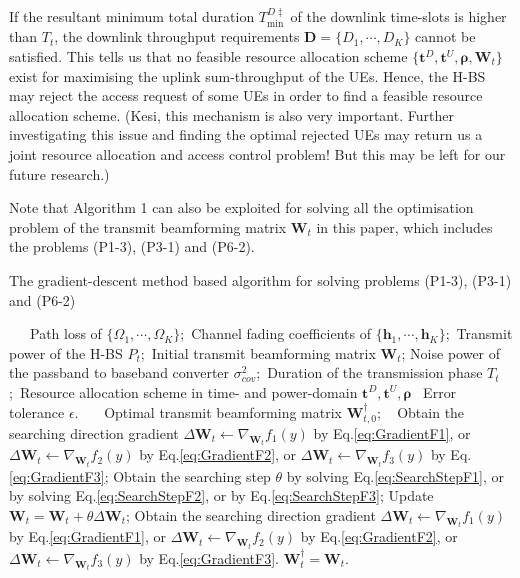 \documentclass[12pt,draft,onecolumn,journal]{IEEEtran}
\begin{document}
If the resultant minimum total duration $T_{\min}^{D\ddagger}$ of the downlink time-slots is higher than $T_t$, the downlink throughput requirements $\mathbf{D}=\{D_1,\cdots,D_K\}$ cannot be satisfied. This tells us that no feasible resource allocation scheme $\{\mathbf{t}^D, \mathbf{t}^U, \boldsymbol{\rho}, \mathbf{W}_t\}$ exist for maximising the uplink sum-throughput of the UEs. Hence, the H-BS may reject the access request of some UEs in order to find a feasible resource allocation scheme. {\color{red} (Kesi, this mechanism is also very important. Further investigating this issue and finding the optimal rejected UEs may return us a joint resource allocation and access control problem! But this may be left for our future research.)}

Note that Algorithm 1 can also be exploited for solving all the optimisation problem of the transmit beamforming matrix $\mathbf{W}_t$ in this paper, which includes the problems (P1-3), (P3-1) and (P6-2). 

\begin{algorithm}[!t]
	\caption{The gradient-descent method based algorithm for solving problems (P1-3), (P3-1) and (P6-2)}
	\footnotesize
	\begin{algorithmic}[1]
		\REQUIRE ~~\
		Path loss of $\{\Omega_1,\cdots,\Omega_K\}$;\
		Channel fading coefficients of $\{\mathbf{h}_1,\cdots,\mathbf{h}_K\}$;\
		Transmit power of the H-BS $P_{t}$;\
		Initial transmit beamforming matrix $\mathbf{W}_t$;
		Noise power of the passband to baseband converter $\sigma^2_{cov}$;\
		Duration of the transmission phase $T_t$;\
		Resource allocation scheme in time- and power-domain $\mathbf{t}^D, \mathbf{t}^U, \boldsymbol{\rho}$ \
		Error tolerance $\epsilon$.
		\ENSURE ~~\
		Optimal transmit beamforming matrix $\mathbf{W}_{t,0}^{\dagger}$; \
		\STATE Obtain the searching direction gradient $\Delta{\mathbf{W}_t}\leftarrow \nabla_{\mathbf{W}_t} f_1(y)$ by Eq.\eqref{eq:GradientF1}, or $\Delta{\mathbf{W}_t}\leftarrow\nabla_{\mathbf{W}_t} f_2(y)$ by Eq.\eqref{eq:GradientF2}, or $\Delta{\mathbf{W}_t}\leftarrow\nabla_{\mathbf{W}_t} f_3(y)$ by Eq.\eqref{eq:GradientF3};
		\WHILE{$||\Delta\mathbf{W}_t||\leq \epsilon$}
		\STATE Obtain the searching step $\theta$ by solving Eq.\eqref{eq:SearchStepF1}, or by solving Eq.\eqref{eq:SearchStepF2}, or by Eq.\eqref{eq:SearchStepF3};
		\STATE Update $\mathbf{W}_t = \mathbf{W}_t + \theta \Delta \mathbf{W}_t$;
		\STATE Obtain the searching direction gradient $\Delta{\mathbf{W}_t}\leftarrow \nabla_{\mathbf{W}_t} f_1(y)$ by Eq.\eqref{eq:GradientF1}, or $\Delta{\mathbf{W}_t}\leftarrow\nabla_{\mathbf{W}_t} f_2(y)$ by Eq.\eqref{eq:GradientF2}, or $\Delta{\mathbf{W}_t}\leftarrow\nabla_{\mathbf{W}_t} f_3(y)$ by Eq.\eqref{eq:GradientF3}.
		\ENDWHILE
		\RETURN $\mathbf{W}_t^{\dagger} = \mathbf{W}_t$.
	\end{algorithmic}
\end{algorithm}
\end{document}
